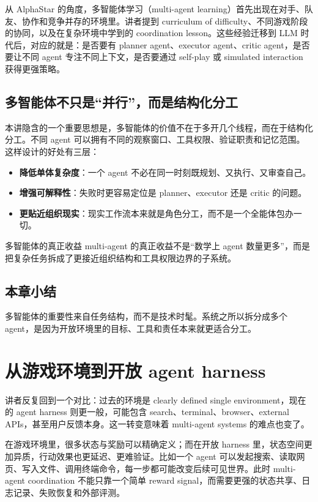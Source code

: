 \documentclass[a4paper]{article}
\begin{document}
从 AlphaStar 的角度，多智能体学习（multi-agent learning）首先出现在对手、队友、协作和竞争并存的环境里。讲者提到 curriculum of difficulty、不同游戏阶段的协同，以及在复杂环境中学到的 coordination lesson。这些经验迁移到 LLM 时代后，对应的就是：是否要有 planner agent、executor agent、critic agent，是否要让不同 agent 专注不同上下文，是否要通过 self-play 或 simulated interaction 获得更强策略。

\subsection{多智能体不只是“并行”，而是结构化分工}
本讲隐含的一个重要思想是，多智能体的价值不在于多开几个线程，而在于结构化分工。不同 agent 可以拥有不同的观察窗口、工具权限、验证职责和记忆范围。这样设计的好处有三层：
\begin{itemize}[leftmargin=1.5em]
\item \textbf{降低单体复杂度}：一个 agent 不必在同一时刻既规划、又执行、又审查自己。
\item \textbf{增强可解释性}：失败时更容易定位是 planner、executor 还是 critic 的问题。
\item \textbf{更贴近组织现实}：现实工作流本来就是角色分工，而不是一个全能体包办一切。
\end{itemize}

\begin{importantbox}{多智能体的真正收益}
multi-agent 的真正收益不是“数学上 agent 数量更多”，而是把复杂任务拆成了更接近组织结构和工具权限边界的子系统。
\end{importantbox}

\subsection{本章小结}
多智能体的重要性来自任务结构，而不是技术时髦。系统之所以拆分成多个 agent，是因为开放环境里的目标、工具和责任本来就更适合分工。

\section{从游戏环境到开放 agent harness}
讲者反复回到一个对比：过去的环境是 clearly defined single environment，现在的 agent harness 则更一般，可能包含 search、terminal、browser、external APIs，甚至用户反馈本身。这一转变意味着 multi-agent systems 的难点也变了。

在游戏环境里，很多状态与奖励可以精确定义；而在开放 harness 里，状态空间更加异质，行动效果也更延迟、更难验证。比如一个 agent 可以发起搜索、读取网页、写入文件、调用终端命令，每一步都可能改变后续可见世界。此时 multi-agent coordination 不能只靠一个简单 reward signal，而需要更强的状态共享、日志记录、失败恢复和外部评测。
\end{document}
